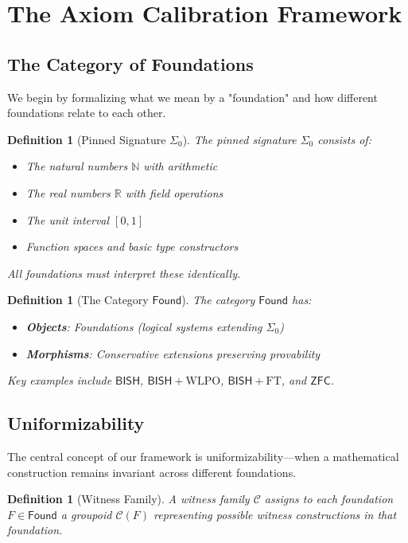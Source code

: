 \documentclass[11pt]{article}
\newtheorem{definition}[theorem]{Definition}
\newcommand{\N}{\mathbb{N}}
\newcommand{\R}{\mathbb{R}}
\newcommand{\WLPO}{\mathrm{WLPO}}
\newcommand{\FT}{\mathrm{FT}}
\newcommand{\BISH}{\mathsf{BISH}}
\newcommand{\ZFC}{\mathsf{ZFC}}
\newcommand{\Found}{\mathsf{Found}}
\newcommand{\SigmaZero}{\Sigma_{0}}
\begin{document}
\section{The Axiom Calibration Framework}

\subsection{The Category of Foundations}

We begin by formalizing what we mean by a "foundation" and how different foundations relate to each other.

\begin{definition}[Pinned Signature $\SigmaZero$]
The \emph{pinned signature} $\SigmaZero$ consists of:
\begin{itemize}
\item The natural numbers $\N$ with arithmetic
\item The real numbers $\R$ with field operations
\item The unit interval $[0,1]$
\item Function spaces and basic type constructors
\end{itemize}
All foundations must interpret these identically.
\end{definition}

\begin{definition}[The Category $\Found$]
The category $\Found$ has:
\begin{itemize}
\item \textbf{Objects}: Foundations (logical systems extending $\SigmaZero$)
\item \textbf{Morphisms}: Conservative extensions preserving provability
\end{itemize}
Key examples include $\BISH$, $\BISH + \WLPO$, $\BISH + \FT$, and $\ZFC$.
\end{definition}

\subsection{Uniformizability}

The central concept of our framework is uniformizability—when a mathematical construction remains invariant across different foundations.

\begin{definition}[Witness Family]
A \emph{witness family} $\mathcal{C}$ assigns to each foundation $F \in \Found$ a groupoid $\mathcal{C}(F)$ representing possible witness constructions in that foundation.
\end{definition}
\end{document}
